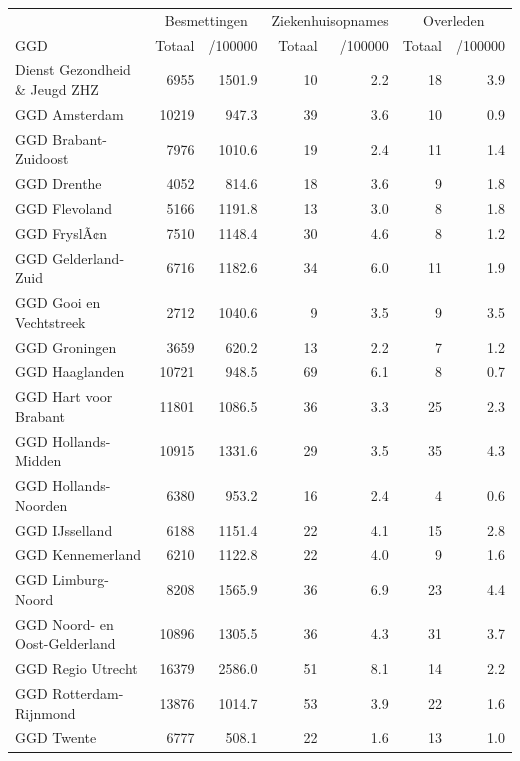 \documentclass[
  english,
  man,floatsintext]{apa6}
\begin{document}
\begin{table}
\centering\begingroup\fontsize{10}{12}\selectfont

\begin{threeparttable}
\begin{tabular}{lrrrrrr}
\toprule
\multicolumn{1}{c}{ } & \multicolumn{2}{c}{Besmettingen} & \multicolumn{2}{c}{Ziekenhuisopnames} & \multicolumn{2}{c}{Overleden} \\
\cmidrule(l{3pt}r{3pt}){2-3} \cmidrule(l{3pt}r{3pt}){4-5} \cmidrule(l{3pt}r{3pt}){6-7}
GGD & Totaal & /100000 & Totaal & /100000 & Totaal & /100000\\
\midrule
Dienst Gezondheid \& Jeugd ZHZ & 6955 & 1501.9 & 10 & 2.2 & 18 & 3.9\\
GGD Amsterdam & 10219 & 947.3 & 39 & 3.6 & 10 & 0.9\\
GGD Brabant-Zuidoost & 7976 & 1010.6 & 19 & 2.4 & 11 & 1.4\\
GGD Drenthe & 4052 & 814.6 & 18 & 3.6 & 9 & 1.8\\
GGD Flevoland & 5166 & 1191.8 & 13 & 3.0 & 8 & 1.8\\
GGD FryslÃ¢n & 7510 & 1148.4 & 30 & 4.6 & 8 & 1.2\\
GGD Gelderland-Zuid & 6716 & 1182.6 & 34 & 6.0 & 11 & 1.9\\
GGD Gooi en Vechtstreek & 2712 & 1040.6 & 9 & 3.5 & 9 & 3.5\\
GGD Groningen & 3659 & 620.2 & 13 & 2.2 & 7 & 1.2\\
GGD Haaglanden & 10721 & 948.5 & 69 & 6.1 & 8 & 0.7\\
GGD Hart voor Brabant & 11801 & 1086.5 & 36 & 3.3 & 25 & 2.3\\
GGD Hollands-Midden & 10915 & 1331.6 & 29 & 3.5 & 35 & 4.3\\
GGD Hollands-Noorden & 6380 & 953.2 & 16 & 2.4 & 4 & 0.6\\
GGD IJsselland & 6188 & 1151.4 & 22 & 4.1 & 15 & 2.8\\
GGD Kennemerland & 6210 & 1122.8 & 22 & 4.0 & 9 & 1.6\\
GGD Limburg-Noord & 8208 & 1565.9 & 36 & 6.9 & 23 & 4.4\\
GGD Noord- en Oost-Gelderland & 10896 & 1305.5 & 36 & 4.3 & 31 & 3.7\\
GGD Regio Utrecht & 16379 & 2586.0 & 51 & 8.1 & 14 & 2.2\\
GGD Rotterdam-Rijnmond & 13876 & 1014.7 & 53 & 3.9 & 22 & 1.6\\
GGD Twente & 6777 & 508.1 & 22 & 1.6 & 13 & 1.0\\

\end{tabular}
\end{threeparttable}
\end{table}
\end{document}
